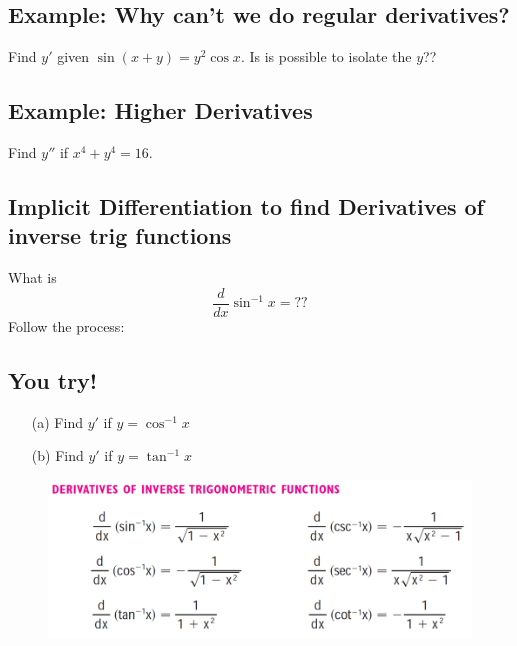 \documentclass[12pt]{book}
\theoremstyle{definition}
\begin{document}
\subsection*{Example: Why can't we do regular derivatives?}
Find $y'$ given $\sin(x+y)=y^2\cos x$. Is is possible to isolate the $y$??
\raggedbottom
\clearpage
\subsection*{Example: Higher Derivatives}
Find $y''$ if $x^4+y^4=16$.\vspace{7cm}
\subsection*{Implicit Differentiation to find Derivatives of inverse trig functions}
What is
\[
\frac{d}{dx}\sin^{-1}x=??
\]
Follow the process:
\raggedbottom
\clearpage
\subsection*{You try!}
\begin{itemize}
\item[(a)]Find $y'$ if $y=\cos^{-1}x$ \vspace{6cm}
\item[(b)]Find $y'$ if $y=\tan^{-1}x$\vspace{4cm}
\end{itemize}
\begin{figure}[h!]
    \centering
    \includegraphics{fig2.png}
\end{figure}
\end{document}
